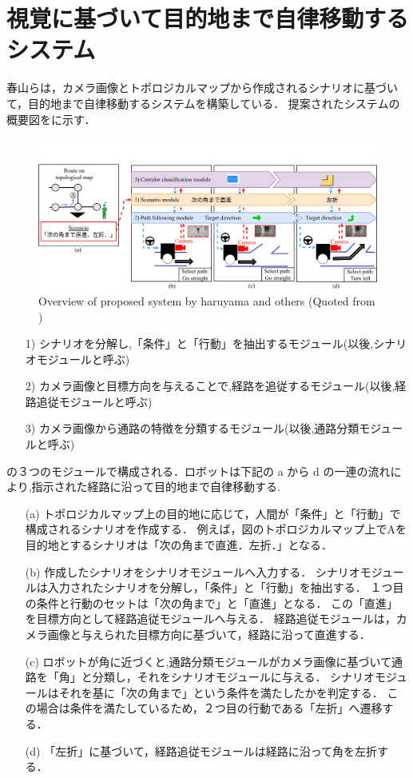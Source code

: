 \section{視覚に基づいて目的地まで自律移動するシステム}
春山らは，カメラ画像とトポロジカルマップから作成されるシナリオに基づいて，目的地まで自律移動するシステムを構築している．
提案されたシステムの概要図をに示す．

\begin{figure}[htbp]
  \centering
   \includegraphics[width=130mm]{images/pdf/haruyama/system.pdf}
   \caption[Overview of proposed system by haruyama and others]{Overview of proposed system by haruyama and others (Quoted from \cite{haruyama2023})}
   \label{fig:sys}
\end{figure}

\begin{enumerate}
  \item [1)]シナリオを分解し,「条件」と「行動」を抽出するモジュール(以後,シナリオモジュールと呼ぶ)
  \item [2)]カメラ画像と目標方向を与えることで,経路を追従するモジュール(以後,経路追従モジュールと呼ぶ)
  \item [3)]カメラ画像から通路の特徴を分類するモジュール(以後,通路分類モジュールと呼ぶ)
\end{enumerate}

の３つのモジュールで構成される．ロボットは下記の a から d の一連の流れにより,指示された経路に沿って目的地まで自律移動する.
\begin{enumerate}
  \item [(a)] 
  トポロジカルマップ上の目的地に応じて，人間が「条件」と「行動」で構成されるシナリオを作成する．
  例えば，図のトポロジカルマップ上でAを目的地とするシナリオは「次の角まで直進．左折．」となる．
  \item [(b)] 
  作成したシナリオをシナリオモジュールへ入力する．
  シナリオモジュールは入力されたシナリオを分解し，「条件」と「行動」を抽出する．
  １つ目の条件と行動のセットは「次の角まで」と「直進」となる．
  この「直進」を目標方向として経路追従モジュールへ与える．
  経路追従モジュールは，カメラ画像と与えられた目標方向に基づいて，経路に沿って直進する．
  \item [(c)] 
  ロボットが角に近づくと,通路分類モジュールがカメラ画像に基づいて通路を「角」と分類し，それをシナリオモジュールに与える．
  シナリオモジュールはそれを基に「次の角まで」という条件を満たしたかを判定する．
  この場合は条件を満たしているため，２つ目の行動である「左折」へ遷移する．
  \item [(d)]「左折」に基づいて，経路追従モジュールは経路に沿って角を左折する．
\end{enumerate}

